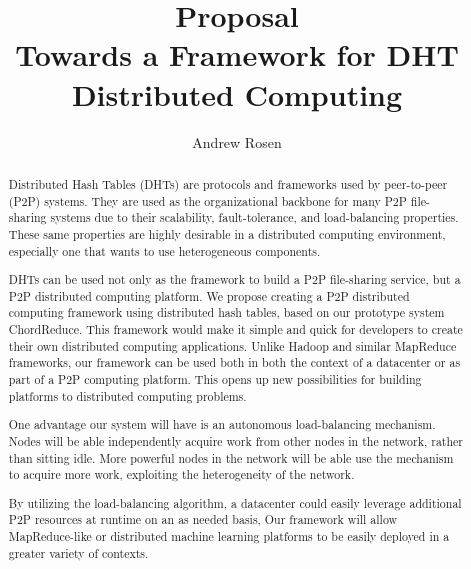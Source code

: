 \documentclass[10pt,letterpaper]{report}
\title{Proposal \\ Towards a Framework for DHT Distributed Computing}
\author{Andrew Rosen}
\begin{document}
\maketitle




\setcounter{tocdepth}{4}
\tableofcontents
\newpage

\begin{abstract}
Distributed Hash Tables (DHTs) are protocols and frameworks used by peer-to-peer (P2P) systems.
They are used as the organizational backbone for many P2P file-sharing systems due to their scalability, fault-tolerance, and load-balancing properties.
These same properties are highly desirable in a distributed computing environment, especially one that wants to use heterogeneous components.

DHTs can be used not only as the framework to build a P2P file-sharing service, but a P2P distributed computing platform.
We propose creating a P2P distributed computing framework using distributed hash tables, based on our prototype system ChordReduce.
This framework would make it simple and quick for developers to create their own distributed computing applications.
Unlike Hadoop and similar MapReduce frameworks, our framework can be used both in both the context of a datacenter or as part of a P2P computing platform.  
This opens up new possibilities for building platforms to distributed computing problems.

One advantage our system will have is an autonomous load-balancing mechanism.
Nodes will be able independently acquire work from other nodes in the network, rather than sitting idle.
More powerful nodes in the network will be able use the mechanism to acquire more work, exploiting the heterogeneity of the network.

By utilizing the load-balancing algorithm, a datacenter could easily leverage additional P2P resources at runtime on an as needed basis,
Our framework will allow MapReduce-like or distributed machine learning platforms to be easily deployed in a greater variety of contexts.


\end{abstract}






%



\end{document}
